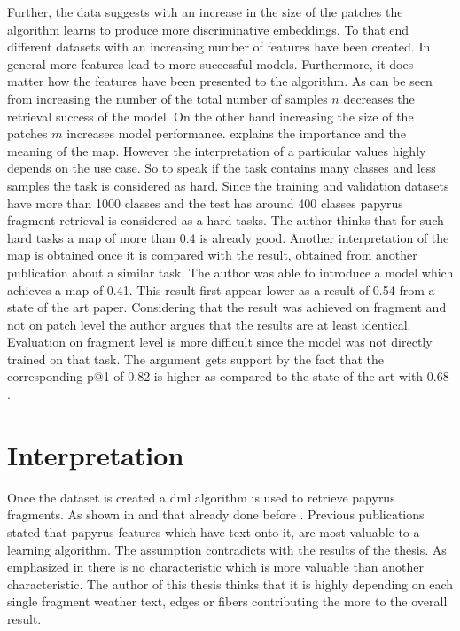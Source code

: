 \noindent Further, the data suggests with an increase in the size of the patches the algorithm learns to produce more discriminative embeddings. To that end different datasets with an increasing number of features have been created. In general more features lead to more successful models. Furthermore, it does matter how the features have been presented to the algorithm. As can be seen from  increasing the number of the total number of samples \(n\) decreases the retrieval success of the model. On the other hand increasing the size of the patches \(m\) increases model performance.  explains the importance and the meaning of the \ac{map}. However the interpretation of a particular values highly depends on the use case. So to speak if the task contains many classes and less samples the task is considered as hard. Since the training and validation datasets have more than 1000 classes and the test has around 400 classes papyrus fragment retrieval is considered as a hard tasks. The author thinks that for such hard tasks a \ac{map} of more than 0.4 is already good. Another interpretation of the \ac{map} is obtained once it is compared with the result, obtained from another publication about a similar task. The author was able to introduce a model which achieves a map of 0.41. This result first appear lower as a result of 0.54 from a state of the art paper. Considering that the result was achieved on fragment and not on patch level the author argues that the results are at least identical. Evaluation on fragment level is more difficult since the model was not directly trained on that task. The argument gets support by the fact that the corresponding \ac{p@1} of 0.82 is higher as compared to the state of the art with 0.68 \cite{Pirrone21}.

\section{Interpretation}
\label{sec:interpret}
Once the dataset is created a \ac{dml} algorithm is used to retrieve papyrus fragments. As shown in  and  that already done before \cite{Pirrone21}. Previous publications stated that papyrus features which have text onto it, are most valuable to a learning algorithm. The assumption contradicts with the results of the thesis. As emphasized in  there is no characteristic which is more valuable than another characteristic. The author of this thesis thinks that it is highly depending on each single fragment weather text, edges or fibers contributing the more to the overall result.\\

